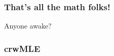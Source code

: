 \documentclass[36pt]{beamer}
\newcommand{\ft}[1]{\frametitle{#1}}
\begin{document}
{
\begin{frame}[t]
\frametitle{That's all the math folks!}
Anyone awake?
\end{frame}
}


\begin{frame}
\ft{crwMLE}

\end{frame}
\end{document}
